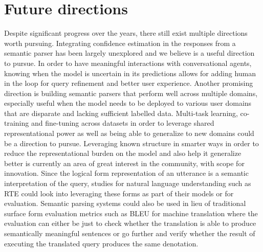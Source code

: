 \documentclass[akbc,twoside,11pt]{article}
\begin{document}
{\section{Future directions}
\label{sec:conc}
Despite significant progress over the years, there still exist multiple directions worth pursuing. Integrating confidence estimation in the responses from a semantic parser has been largely unexplored and we believe is a useful direction to pursue. In order to have meaningful interactions with conversational agents, knowing when the model is uncertain in its predictions allows for adding human in the loop for query refinement and better user experience. Another promising direction is building semantic parsers that perform well across multiple domains, especially useful when the model needs to be deployed to various user domains that are disparate and lacking sufficient labelled data. Multi-task learning, co-training and fine-tuning across datasets in order to leverage shared representational power as well as being able to generalize to new domains could be a direction to pursue. Leveraging known structure in smarter ways in order to reduce the representational burden on the model and also help it generalize better is currently an area of great interest in the community, with scope for innovation.
Since the logical form representation of an utterance is a semantic interpretation of the query, studies for natural language understanding such as RTE could look into leveraging these forms as part of their models or for evaluation. Semantic parsing systems could also be used in lieu of traditional surface form evaluation metrics such as BLEU for machine translation where the evaluation can either be just to check whether the translation is able to produce semantically meaningful sentences or go further and verify whether the result of executing the translated query produces the same denotation. 
}


\end{document}

